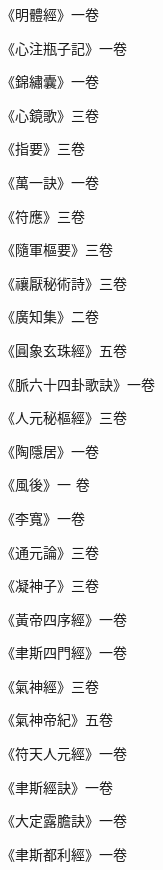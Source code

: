 \begin{pinyinscope}
 《明體經》一卷



 《心注瓶子記》一卷



 《錦繡囊》一卷



 《心鏡歌》三卷



 《指要》三卷



 《萬一訣》一卷



 《符應》三卷



 《隨軍樞要》三卷



 《禳厭秘術詩》三卷



 《廣知集》二卷



 《圓象玄珠經》五卷



 《脈六十四卦歌訣》一卷



 《人元秘樞經》三卷



 《陶隱居》一卷



 《風後》一
 卷



 《李寬》一卷



 《通元論》三卷



 《凝神子》三卷



 《黃帝四序經》一卷



 《聿斯四門經》一卷



 《氣神經》三卷



 《氣神帝紀》五卷



 《符天人元經》一卷



 《聿斯經訣》一卷



 《大定露膽訣》一卷



 《聿斯都利經》一卷




\end{pinyinscope}
